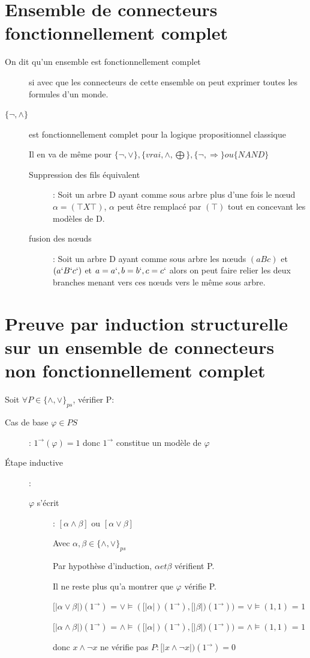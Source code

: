 \section{Ensemble de connecteurs fonctionnellement complet}
\begin{description}
\item[On dit qu'un ensemble est fonctionnellement complet] si avec que les connecteurs de cette ensemble on peut exprimer toutes les formules d'un monde.
\item[$\{\neg, \wedge\}$] est fonctionnellement complet pour la logique propositionnel classique
\item[] Il en va de même pour $\{\neg, \vee\}, \{vrai, \wedge, \bigoplus\}, \{\neg, \Rightarrow\} ou \{NAND\}$

\begin{description}
\item[Suppression des fils équivalent]: Soit un arbre D ayant comme sous arbre plus d'une fois le nœud $\alpha = (\top X \top)$, $\alpha$ peut être remplacé par $(\top)$ tout en concevant les modèles de D.
\item[fusion des nœuds]: Soit un arbre D ayant comme sous arbre les nœuds $(a B c)$ et $(a` B` c`)$ et $a = a`, b = b`, c = c`$ alors on peut faire relier les deux branches menant vers ces nœuds vers le même sous arbre.
\end{description}
\end{description}

\section{Preuve par induction structurelle sur un ensemble de connecteurs non fonctionnellement complet}

Soit $ \forall P \in \{ \wedge, \vee \}_{ps}$, vérifier P:
\begin{description}
\item[Cas de base $\varphi \in PS$]: $1^\rightarrow (\varphi) = 1$ donc $1^\rightarrow$ constitue un modèle de $\varphi$
\item[Étape inductive]: 
\begin{description}
\item[$\varphi$ s'écrit]: $[\alpha \wedge \beta]$ ou $[\alpha \vee \beta]$
\item[] Avec $\alpha, \beta \in \{ \wedge, \vee \}_{ps}$
\item[] Par hypothèse d'induction, $\alpha et \beta$ vérifient P.
\item[] Il ne reste plus qu'a montrer que $\varphi$ vérifie P.
\item[] $[| \alpha \vee \beta |)(1^\rightarrow)$ = $\vee \models ([|\alpha |)(1^\rightarrow), [|\beta |)(1^\rightarrow))$ = $\vee \models (1,1)$ = $1$
\item[] $[| \alpha \wedge \beta |)(1^\rightarrow)$ = $\wedge \models ([|\alpha |)(1^\rightarrow), [|\beta |)(1^\rightarrow))$ = $\wedge \models (1,1)$ = $1$
\item[] donc $x \wedge \neg x$ ne vérifie pas  $P: [| x \wedge \neg x|)(1^\rightarrow) = 0$
\end{description}
\end{description}

